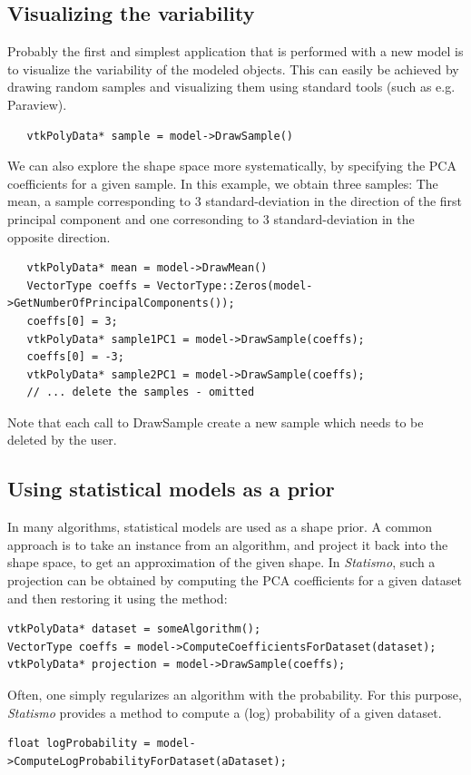 \documentclass{InsightArticle}
\newcommand{\Statismo}{\emph{Statismo}\xspace}
\begin{document}
\subsection{Visualizing the variability}
Probably the first and simplest application that is performed with a new model is to visualize the variability of the modeled objects. 
This can easily be achieved by drawing random samples and visualizing them using standard tools (such as e.g. Paraview). 
\begin{verbatim}
   vtkPolyData* sample = model->DrawSample()
\end{verbatim}
We can also explore the shape space more systematically, by specifying
the PCA coefficients for a given sample. In this example, we obtain three samples:
The mean, a sample corresponding to 3 standard-deviation in the direction of the
first principal component and one corresonding to 3 standard-deviation in the opposite direction.
\begin{verbatim}
   vtkPolyData* mean = model->DrawMean()
   VectorType coeffs = VectorType::Zeros(model->GetNumberOfPrincipalComponents());
   coeffs[0] = 3;
   vtkPolyData* sample1PC1 = model->DrawSample(coeffs);
   coeffs[0] = -3;
   vtkPolyData* sample2PC1 = model->DrawSample(coeffs);
   // ... delete the samples - omitted
\end{verbatim}
Note that each call to DrawSample create a new sample which needs to be deleted by the user.


\subsection{Using statistical models as  a prior}
In many algorithms, statistical models are used as a shape prior. 
A common approach is to take an instance from an algorithm, and project it back into the 
shape space, to get an approximation of the given shape. In \Statismo, such a projection can be
obtained by computing the PCA coefficients for a given dataset and then restoring it using the 
 method:
\begin{verbatim}
vtkPolyData* dataset = someAlgorithm();
VectorType coeffs = model->ComputeCoefficientsForDataset(dataset);
vtkPolyData* projection = model->DrawSample(coeffs);
\end{verbatim}
Often, one simply regularizes an algorithm with the probability. For this purpose, \Statismo 
provides a method to compute a (log) probability of a given dataset. 
\begin{verbatim}
float logProbability = model->ComputeLogProbabilityForDataset(aDataset);
\end{verbatim}
\end{document}

